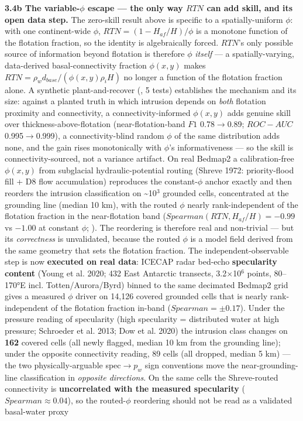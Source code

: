 \documentclass[11pt]{article}
\begin{document}
\textbf{3.4b The variable-$\phi $ escape — the only way $RTN$ can add skill, and its open data step.} The zero-skill result above is specific to a spatially-uniform $\phi $: with one continent-wide $\phi $, $RTN=(1-H_{af}/H)/\phi $ is a monotone function of the flotation fraction, so the identity is algebraically forced. $RTN$'s only possible source of information beyond flotation is therefore $\phi $ \emph{itself} — a spatially-varying, data-derived basal-connectivity fraction $\phi (x,y)$ makes $RTN=\rho _{w} d_{base}/(\phi (x,y) \rho _{i} H)$ no longer a function of the flotation fraction alone. A synthetic plant-and-recover (, 5 tests) establishes the mechanism and its size: against a planted truth in which intrusion depends on \emph{both} flotation proximity and connectivity, a connectivity-informed $\phi (x,y)$ adds genuine skill over thickness-above-flotation (near-flotation-band $F1$ 0.78\ensuremath{\to}0.89; $ROC-AUC$ 0.995\ensuremath{\to}0.999), a connectivity-blind random $\phi $ of the same distribution adds none, and the gain rises monotonically with $\phi $'s informativeness — so the skill is connectivity-sourced, not a variance artifact. On real Bedmap2 a calibration-free $\phi (x,y)$ from subglacial hydraulic-potential routing (Shreve 1972: priority-flood fill + D8 flow accumulation) reproduces the constant-$\phi $ anchor exactly and then reorders the intrusion classification on \textasciitilde{}10\ensuremath{^{3}} grounded cells, concentrated at the grounding line (median 10 km), with the routed $\phi $ nearly rank-independent of the flotation fraction in the near-flotation band ($Spearman(RTN, H_{af}/H)=-0.99$ vs $-1.00$ at constant $\phi $; ). The reordering is therefore real and non-trivial — but its \emph{correctness} is unvalidated, because the routed $\phi $ is a model field derived from the same geometry that sets the flotation fraction. The independent-observable step is now \textbf{executed on real data}: ICECAP radar bed-echo \textbf{specularity content} (Young et al. 2020; 432 East Antarctic transects, 3.2\ensuremath{\times}10\ensuremath{^{6}} points, 80–170°E incl. Totten/Aurora/Byrd) binned to the same decimated Bedmap2 grid gives a measured $\phi $ driver on 14,126 covered grounded cells that is nearly rank-independent of the flotation fraction in-band ($Spearman=\pm 0.17$). Under the pressure reading of specularity (high specularity = distributed water at high pressure; Schroeder et al. 2013; Dow et al. 2020) the intrusion class changes on \textbf{162} covered cells (all newly flagged, median 10 km from the grounding line); under the opposite connectivity reading, 89 cells (all dropped, median 5 km) — the two physically-arguable spec\ensuremath{\to}$p_{w}$ sign conventions move the near-grounding-line classification in \emph{opposite directions}. On the same cells the Shreve-routed connectivity is \textbf{uncorrelated with the measured specularity} ($Spearman\approx 0.04$), so the routed-$\phi $ reordering should not be read as a validated basal-water proxy 
\end{document}
